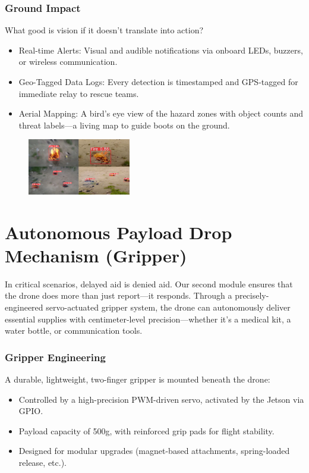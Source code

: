 \documentclass[12pt]{report}
\begin{document}
    \subsubsection{\large Ground Impact}
    What good is vision if it doesn’t translate into action?
\begin{itemize}
  \item Real-time Alerts: Visual and audible notifications via onboard LEDs, buzzers, or wireless communication.
  \item Geo-Tagged Data Logs: Every detection is timestamped and GPS-tagged for immediate relay to rescue teams.
  \item Aerial Mapping: A bird’s eye view of the hazard zones with object counts and threat labels—a living map to guide boots on the ground.
\end{itemize}

\begin{figure}[H]
  \begin{center}
    \includegraphics[width=0.4\textwidth]{obj.png}
  \end{center}
  \caption{}\label{fig:obj}
\end{figure}


    \section{Autonomous Payload Drop Mechanism (Gripper)}
    In critical scenarios, delayed aid is denied aid. Our second module ensures that the drone does more than just report—it responds. Through a precisely-engineered servo-actuated gripper system, the drone can autonomously deliver essential supplies with centimeter-level precision—whether it’s a medical kit, a water bottle, or communication tools.

    \subsubsection{Gripper Engineering}
    A durable, lightweight, two-finger gripper is mounted beneath the drone:
    \begin{itemize}
      \item Controlled by a high-precision PWM-driven servo, activated by the Jetson via GPIO.
      \item Payload capacity of 500g, with reinforced grip pads for flight stability.
      \item Designed for modular upgrades (magnet-based attachments, spring-loaded release, etc.).
    \end{itemize}
\end{document}
